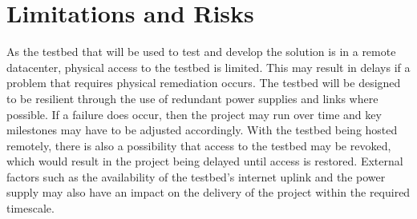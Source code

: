 \section{Limitations and Risks}
\label{intro:constraints}
As the testbed that will be used to test and develop the solution is in a remote datacenter, physical access to the testbed is limited. This may result in delays if a problem that requires physical remediation occurs. The testbed will be designed to be resilient through the use of redundant power supplies and links where possible. If a failure does occur, then the project may run over time and key milestones may have to be adjusted accordingly. With the testbed being hosted remotely, there is also a possibility that access to the testbed may be revoked, which would result in the project being delayed until access is restored. External factors such as the availability of the testbed's internet uplink and the power supply may also have an impact on the delivery of the project within the required timescale.
